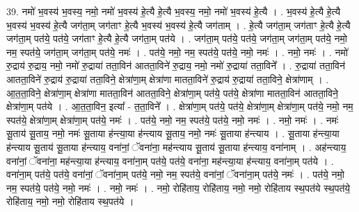 \documentclass[17pt]{extarticle}
\begin{document}
39. नमो॑ भ॒वस्य॑ भ॒वस्य॒ नमो॒ नमो॑ भ॒वस्य॑ हे॒त्यै हे॒त्यै भ॒वस्य॒ नमो॒ नमो॑ भ॒वस्य॑ हे॒त्यै । . भ॒वस्य॑ हे॒त्यै हे॒त्यै भ॒वस्य॑ भ॒वस्य॑ हे॒त्यै जग॑ता॒म् जग॑ताꣳ हे॒त्यै भ॒वस्य॑ भ॒वस्य॑ हे॒त्यै जग॑ताम् । . हे॒त्यै जग॑ता॒म् जग॑ताꣳ हे॒त्यै हे॒त्यै जग॑ता॒म् पत॑ये॒ पत॑ये॒ जग॑ताꣳ हे॒त्यै हे॒त्यै जग॑ता॒म् पत॑ये । . जग॑ता॒म् पत॑ये॒ पत॑ये॒ जग॑ता॒म् जग॑ता॒म् पत॑ये॒ नमो॒ नम॒ स्पत॑ये॒ जग॑ता॒म् जग॑ता॒म् पत॑ये॒ नमः॑ । . पत॑ये॒ नमो॒ नम॒ स्पत॑ये॒ पत॑ये॒ नमो॒ नमः॑ । . नमो॒ नमः॑ । . नमो॑ रु॒द्राय॑ रु॒द्राय॒ नमो॒ नमो॑ रु॒द्राया॑ तता॒विन॑ आतता॒विने॑ रु॒द्राय॒ नमो॒ नमो॑ रु॒द्राया॑ तता॒विने᳚ । . रु॒द्राया॑ तता॒विन॑ आतता॒विने॑ रु॒द्राय॑ रु॒द्राया॑ तता॒विने॒ क्षेत्रा॑णा॒म् क्षेत्रा॑णा मातता॒विने॑ रु॒द्राय॑ रु॒द्राया॑ तता॒विने॒ क्षेत्रा॑णाम् । . आ॒त॒ता॒विने॒ क्षेत्रा॑णा॒म् क्षेत्रा॑णा मातता॒विन॑ आतता॒विने॒ क्षेत्रा॑णा॒म् पत॑ये॒ पत॑ये॒ क्षेत्रा॑णा मातता॒विन॑ आतता॒विने॒ क्षेत्रा॑णा॒म् पत॑ये । . आ॒त॒ता॒विन॒ इत्या᳚ - त॒ता॒विने᳚ । . क्षेत्रा॑णा॒म् पत॑ये॒ पत॑ये॒ क्षेत्रा॑णा॒म् क्षेत्रा॑णा॒म् पत॑ये॒ नमो॒ नम॒ स्पत॑ये॒ क्षेत्रा॑णा॒म् क्षेत्रा॑णा॒म् पत॑ये॒ नमः॑ । . पत॑ये॒ नमो॒ नम॒ स्पत॑ये॒ पत॑ये॒ नमो॒ नमः॑ । . नमो॒ नमः॑ । . नमः॑ सू॒ताय॑ सू॒ताय॒ नमो॒ नमः॑ सू॒ताया ह॑न्त्या॒या ह॑न्त्याय सू॒ताय॒ नमो॒ नमः॑ सू॒ताया ह॑न्त्याय । . सू॒ताया ह॑न्त्या॒या ह॑न्त्याय सू॒ताय॑ सू॒ताया ह॑न्त्याय॒ वना॑नां॒ ॅवना॑ना॒ मह॑न्त्याय सू॒ताय॑ सू॒ताया ह॑न्त्याय॒ वना॑नाम् । . अह॑न्त्याय॒ वना॑नां॒ ॅवना॑ना॒ मह॑न्त्या॒या ह॑न्त्याय॒ वना॑ना॒म् पत॑ये॒ पत॑ये॒ वना॑ना॒ मह॑न्त्या॒या ह॑न्त्याय॒ वना॑ना॒म् पत॑ये । . वना॑ना॒म् पत॑ये॒ पत॑ये॒ वना॑नां॒ ॅवना॑ना॒म् पत॑ये॒ नमो॒ नम॒ स्पत॑ये॒ वना॑नां॒ ॅवना॑ना॒म् पत॑ये॒ नमः॑ । . पत॑ये॒ नमो॒ नम॒ स्पत॑ये॒ पत॑ये॒ नमो॒ नमः॑ । . नमो॒ नमः॑ । . नमो॒ रोहि॑ताय॒ रोहि॑ताय॒ नमो॒ नमो॒ रोहि॑ताय स्थ॒पत॑ये स्थ॒पत॑ये॒ रोहि॑ताय॒ नमो॒ नमो॒ रोहि॑ताय स्थ॒पत॑ये । \newline
\pagebreak
{}
\end{document}

